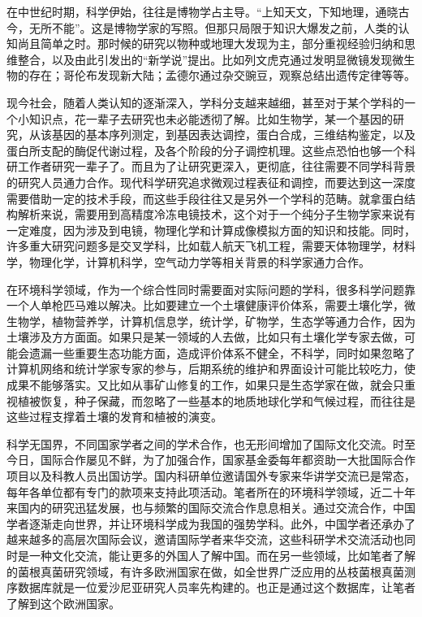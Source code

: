 \documentclass[]{book}
\begin{document}
在中世纪时期，科学伊始，往往是博物学占主导。``上知天文，下知地理，通晓古今，无所不能''。这是博物学家的写照。但那只局限于知识大爆发之前，人类的认知尚且简单之时。那时候的研究以物种或地理大发现为主，部分重视经验归纳和思维整合，以及由此引发出的``新学说''提出。比如列文虎克通过发明显微镜发现微生物的存在；哥伦布发现新大陆；孟德尔通过杂交豌豆，观察总结出遗传定律等等。

现今社会，随着人类认知的逐渐深入，学科分支越来越细，甚至对于某个学科的一个小知识点，花一辈子去研究也未必能透彻了解。比如生物学，某一个基因的研究，从该基因的基本序列测定，到基因表达调控，蛋白合成，三维结构鉴定，以及蛋白所支配的酶促代谢过程，及各个阶段的分子调控机理。这些点恐怕也够一个科研工作者研究一辈子了。而且为了让研究更深入，更彻底，往往需要不同学科背景的研究人员通力合作。现代科学研究追求微观过程表征和调控，而要达到这一深度需要借助一定的技术手段，而这些手段往往又是另外一个学科的范畴。就拿蛋白结构解析来说，需要用到高精度冷冻电镜技术，这个对于一个纯分子生物学家来说有一定难度，因为涉及到电镜，物理化学和计算成像模拟方面的知识和技能。同时，许多重大研究问题多是交叉学科，比如载人航天飞机工程，需要天体物理学，材料学，物理化学，计算机科学，空气动力学等相关背景的科学家通力合作。

在环境科学领域，作为一个综合性同时需要面对实际问题的学科，很多科学问题靠一个人单枪匹马难以解决。比如要建立一个土壤健康评价体系，需要土壤化学，微生物学，植物营养学，计算机信息学，统计学，矿物学，生态学等通力合作，因为土壤涉及方方面面。如果只是某一领域的人去做，比如只有土壤化学专家去做，可能会遗漏一些重要生态功能方面，造成评价体系不健全，不科学，同时如果忽略了计算机网络和统计学家专家的参与，后期系统的维护和界面设计可能比较吃力，使成果不能够落实。又比如从事矿山修复的工作，如果只是生态学家在做，就会只重视植被恢复，种子保藏，而忽略了一些基本的地质地球化学和气候过程，而往往是这些过程支撑着土壤的发育和植被的演变。

科学无国界，不同国家学者之间的学术合作，也无形间增加了国际文化交流。时至今日，国际合作屡见不鲜，为了加强合作，国家基金委每年都资助一大批国际合作项目以及科教人员出国访学。国内科研单位邀请国外专家来华讲学交流已是常态，每年各单位都有专门的款项来支持此项活动。笔者所在的环境科学领域，近二十年来国内的研究迅猛发展，也与频繁的国际交流合作息息相关。通过交流合作，中国学者逐渐走向世界，并让环境科学成为我国的强势学科。此外，中国学者还承办了越来越多的高层次国际会议，邀请国际学者来华交流，这些科研学术交流活动也同时是一种文化交流，能让更多的外国人了解中国。而在另一些领域，比如笔者了解的菌根真菌研究领域，有许多欧洲国家在做，如全世界广泛应用的丛枝菌根真菌测序数据库就是一位爱沙尼亚研究人员率先构建的。也正是通过这个数据库，让笔者了解到这个欧洲国家。
\end{document}
